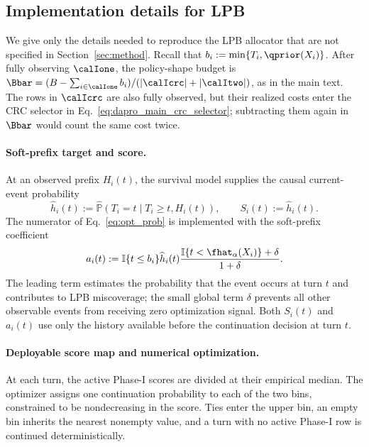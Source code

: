 
\subsection{Implementation details for LPB \ttmethod}
\label{sec:lpb_dapro_implementation}

We give only the details needed to reproduce the LPB allocator that are not
specified in Section~\ref{sec:method}. Recall that
$b_i:=\min\{T_i,\qprior(X_i)\}$. After fully observing \(\calIone\), the
policy-shape budget is
\(
\Bbar=(B-\sum_{i\in\calIone}b_i)/(|\calIcrc|+|\calItwo|)
\), as in the main text. The rows in \(\calIcrc\) are also fully observed,
but their realized costs enter the CRC selector in
Eq.~\eqref{eq:dapro_main_crc_selector}; subtracting them again in \(\Bbar\)
would count the same cost twice.

\paragraph{Soft-prefix target and score.}
At an observed prefix \(H_i(t)\), the survival model supplies the causal
current-event probability
\begin{equation}
    \widehat h_i(t)
    :=\widehat{\mathbb P}\!\left(T_i=t\mid T_i\geq t,H_i(t)\right),
    \qquad S_i(t):=\widehat h_i(t).
    \label{eq:lpb_impl_hazard_score}
\end{equation}
The numerator of Eq.~\eqref{eq:opt_prob} is implemented with the soft-prefix
coefficient
\begin{equation}
    a_i(t)
    :=\mathbb I\{t\leq b_i\}\widehat h_i(t)
      \frac{\mathbb I\{t<\fhat_\alpha(X_i)\}+\delta}{1+\delta}.
    \label{eq:lpb_impl_soft_mass}
\end{equation}
The leading term estimates the probability that the event occurs at turn
\(t\) and contributes to LPB miscoverage; the small global term \(\delta\)
prevents all other observable events from receiving zero optimization signal.
Both \(S_i(t)\) and \(a_i(t)\) use only the history available before the
continuation decision at turn \(t\).

\paragraph{Deployable score map and numerical optimization.}
At each turn, the active Phase-I scores are divided at their empirical median.
The optimizer assigns one continuation probability to each of the two bins,
constrained to be nondecreasing in the score. Ties enter the upper bin, an
empty bin inherits the nearest nonempty value, and a turn with no active
Phase-I row is continued deterministically.

